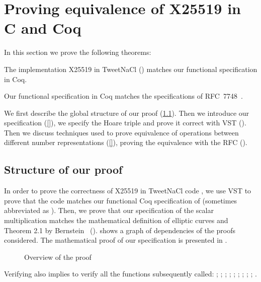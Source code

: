 \section{Proving equivalence of X25519 in C and Coq}
\label{sec:C-Coq-RFC}

In this section we prove the following theorems:
\begin{theorem}
\label{thm:VST}
The implementation X25519 in TweetNaCl () matches our
functional specification in Coq.
\end{theorem}

\begin{theorem}
\label{thm:RFC}
Our functional specification in Coq matches the specifications of RFC~7748~\cite{rfc7748}.
\end{theorem}

We first describe the global structure of our proof (\ref{subsec:proof-structure}).
Then we introduce our specification (\ref{}), we specify the Hoare triple and prove it
correct with VST ().
Then we discuss techniques used to prove equivalence of operations between
different number representations (\ref{}), proving the equivalence with the RFC ().

\subsection{Structure of our proof}
\label{subsec:proof-structure}

In order to prove the correctness of X25519 in TweetNaCl code ,
we use VST to prove that the code matches our functional Coq specification of 
(sometimes abbreviated as ). Then, we prove that our specification of the scalar
multiplication matches the mathematical definition of elliptic curves and Theorem 2.1 by
Bernstein~\cite{Ber06} ().
 shows a graph of dependencies of the proofs considered.
The mathematical proof of our specification is presented
in .
\begin{figure}[h]
  \centering
  
  \caption{Overview of the proof}
  \label{tikz:ProofOverview}
\end{figure}

Verifying  also implies to verify all the functions
subsequently called: ; ; ; ;
; ; ; ; ;
.

